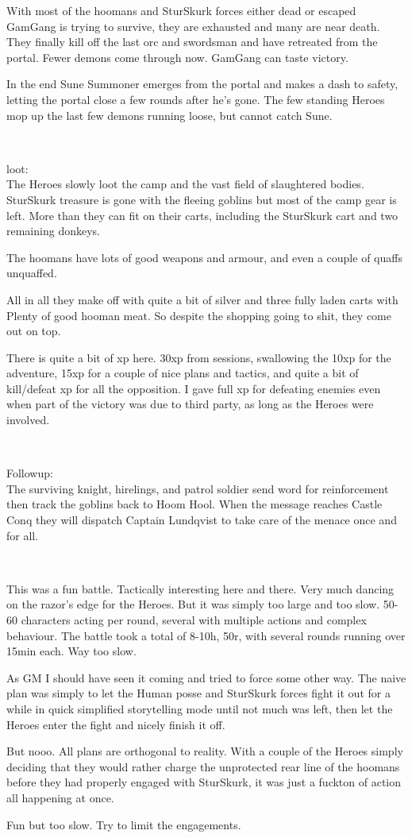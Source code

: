 With most of the hoomans and SturSkurk forces either dead or escaped GamGang is trying to survive, they are exhausted and many are near death. They finally kill off the last orc and swordsman and have retreated from the portal. Fewer demons come through now. GamGang can taste victory.

In the end Sune Summoner emerges from the portal and makes a dash to safety, letting the portal close a few rounds after he's gone. The few standing Heroes mop up the last few demons running loose, but cannot catch Sune.

\

loot:\\
The Heroes slowly loot the camp and the vast field of slaughtered bodies. SturSkurk treasure is gone with the fleeing goblins but most of the camp gear is left. More than they can fit on their carts, including the SturSkurk cart and two remaining donkeys.

The hoomans have lots of good weapons and armour, and even a couple of quaffs unquaffed.

All in all they make off with quite a bit of silver and three fully laden carts with Plenty of good hooman meat. So despite the shopping going to shit, they come out on top.

There is quite a bit of xp here. 30xp from sessions, swallowing the 10xp for the adventure, 15xp for a couple of nice plans and tactics, and quite a bit of kill/defeat xp for all the opposition. I gave full xp for defeating enemies even when part of the victory was due to third party, as long as the Heroes were involved.

\

Followup:\\
The surviving knight, hirelings, and patrol soldier send word for reinforcement then track the goblins back to Hoom Hool. When the message reaches Castle Conq they will dispatch Captain Lundqvist to take care of the menace once and for all.

\

\begin{readoutloud}
This was a fun battle. Tactically interesting here and there. Very much dancing on the razor's edge for the Heroes. But it was simply too large and too slow. 50-60 characters acting per round, several with multiple actions and complex behaviour. The battle took a total of 8-10h, 50r, with several rounds running over 15min each. Way too slow.

As GM I should have seen it coming and tried to force some other way. The naive plan was simply to let the Human posse and SturSkurk forces fight it out for a while in quick simplified storytelling mode until not much was left, then let the Heroes enter the fight and nicely finish it off.

But nooo. All plans are orthogonal to reality. With a couple of the Heroes simply deciding that they would rather charge the unprotected rear line of the hoomans before they had properly engaged with SturSkurk, it was just a fuckton of action all happening at once.

Fun but too slow. Try to limit the engagements. 
\end{readoutloud}


